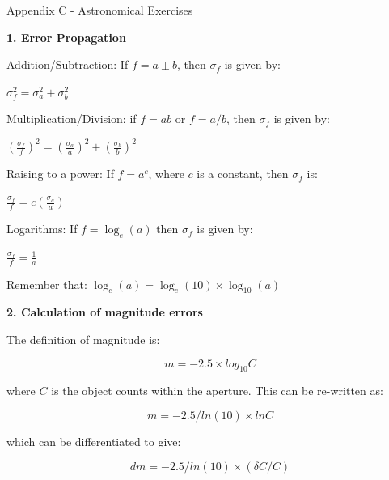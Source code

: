 \documentclass[12pt]{article}
\begin{document}
\newpage

\centerline{\Huge Appendix C - Astronomical Exercises}

\begin{center}
{\large{\bf 1. Error Propagation}}
\end{center}

\noindent
Addition/Subtraction: If $f=a\pm b$, then $\sigma_f$ is given by:
\begin{center}
\Large {$\sigma^2_{f} = \sigma_a^2 + \sigma_b^2$}
\end{center}

\bigskip

Multiplication/Division: if $f=ab$ or $f=a/b$, then $\sigma_f$ is
given by:
\begin{center}
\Large{$\left(\frac{\sigma_f}{f}\right)^2 = \left(\frac{\sigma_a}{a}\right)^2 + \left(\frac{\sigma_b}{b}\right)^2$}
\end{center}

\bigskip

Raising to a power: If $f=a^c$, where $c$ is a constant, then
$\sigma_f$ is:
\begin{center}
\Large{$\frac{\sigma_f}{f}=c\left(\frac{\sigma_a}{a}\right)$}
\end{center}

\bigskip

Logarithms: If $f=\log_{e}(a)$ then $\sigma_f$ is given by:
\begin{center}
\Large{$\frac{\sigma_f}{f}=\frac{1}{a}$}
\end{center}
Remember that: $\log_{e}(a)=\log_{e}(10)\times \log_{10}(a)$



\newpage
\begin{center}
{\large{\bf 2. Calculation of magnitude errors}}
\end{center}

The definition of magnitude is:

\begin{equation}
m = -2.5\times log_{10} C
\end{equation}

\noindent
where $C$ is the object counts within the aperture. This can be re-written as:

\begin{equation}
m = -2.5/ln(10) \times ln C
\end{equation}

\noindent
which can be differentiated to give:

\begin{equation}
dm = -2.5/ln(10) \times (\delta C/C)
\end{equation}
\end{document}
